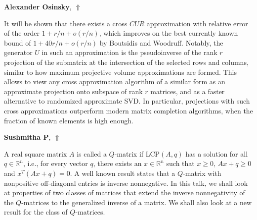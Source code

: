 \documentclass[ILAS2025-program.tex]{subfiles}
\begin{document}
\hypertarget{down0116}{}\begin{ilasabstract}
    
\textbf{Alexander Osinsky},  \hfill \hyperlink{up0116}{$\Uparrow$}
    
    
\mtskip
    It will be shown that there exists a cross $CUR$ approximation with relative error of the order $1+r/n+o(r/n)$, which improves on the best currently known bound of $1+40r/n+o(r/n)$ by Boutsidis and Woodruff. Notably, the generator $U$ in such an approximation is the pseudoinverse of the rank $r$ projection of the submatrix at the intersection of the selected rows and columns, similar to how maximum projective volume approximations are formed. This allows to view any cross approximation algorithm of a similar form as an approximate projection onto subspace of rank $r$ matrices, and as a faster alternative to randomized approximate SVD. In particular, projections with such cross approximations outperform modern matrix completion algorithms, when the fraction of known elements is high enough.


\end{ilasabstract}
    

\hypertarget{down0105}{}\begin{ilasabstract}
    
\textbf{Sushmitha P},  \hfill \hyperlink{up0105}{$\Uparrow$}
    
    
\mtskip
    A real square matrix $A$ is called a $Q$-matrix if LCP$(A,q)$ has a solution for all $q\in \mathbb{R}^n$, i.e., for every vector $q$, there exists an $x\in \mathbb{R}^n$ such that $x\geq 0$, $Ax+q\geq 0$ and $x^T(Ax+q)=0$. A well known result states that a $Q$-matrix with nonpositive off-diagonal entries is inverse nonnegative. In this talk, we shall look at properties of two classes of matrices that extend the inverse nonnegativity of the $Q$-matrices to the generalized inverse of a matrix. We shall also look at a new result for the class of $Q$-matrices.

\end{ilasabstract}
    
\end{document}
